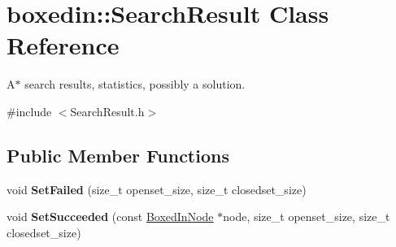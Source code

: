 \hypertarget{classboxedin_1_1SearchResult}{\section{boxedin\+:\+:Search\+Result Class Reference}
\label{classboxedin_1_1SearchResult}
}


A$\ast$ search results, statistics, possibly a solution.  




{\ttfamily \#include $<$Search\+Result.\+h$>$}

\subsection*{Public Member Functions}
\begin{DoxyCompactItemize}
\item 
\hypertarget{classboxedin_1_1SearchResult_a908673bfad091b9413082ab0074f24ff}{void {\bfseries Set\+Failed} (size\+\_\+t openset\+\_\+size, size\+\_\+t closedset\+\_\+size)}\label{classboxedin_1_1SearchResult_a908673bfad091b9413082ab0074f24ff}

\item 
\hypertarget{classboxedin_1_1SearchResult_a0f3f84329dc4d8519fcbf15f09fd8fd0}{void {\bfseries Set\+Succeeded} (const \hyperlink{classboxedin_1_1BoxedInNode}{Boxed\+In\+Node} $\ast$node, size\+\_\+t openset\+\_\+size, size\+\_\+t closedset\+\_\+size)}\label{classboxedin_1_1SearchResult_a0f3f84329dc4d8519fcbf15f09fd8fd0}

\end{DoxyCompactItemize}
